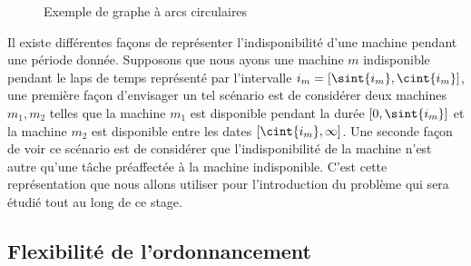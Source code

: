 \documentclass[a4paper,11pt]{report}
\begin{document}
\begin{figure}
    \centering
    \caption{Exemple de graphe à arcs circulaires}
    \label{fig:ex_ac}
\end{figure}

Il existe différentes façons de représenter l'indisponibilité d'une machine pendant une période
donnée. Supposons que nous ayons une machine $m$ indisponible pendant le laps de temps représenté par
l'intervalle $i_m = \left[ \sint{i_m}, \cint{i_m} \right]$, une première façon d'envisager un tel
scénario est de considérer deux machines $m_1, m_2$ telles que la machine $m_1$ est disponible
pendant la durée $\left[ 0, \sint{i_m} \right]$ et la machine $m_2$ est disponible entre les dates
$\left[ \cint{i_m}, \infty \right]$. Une seconde façon de voir ce scénario est de considérer que
l'indisponibilité de la machine n'est autre qu'une tâche préaffectée à la machine indisponible. C'est
cette représentation que nous allons utiliser pour l'introduction du problème \fisched{} qui sera
étudié tout au long de ce stage.

\subsection{Flexibilité de l'ordonnancement}
\end{document}
